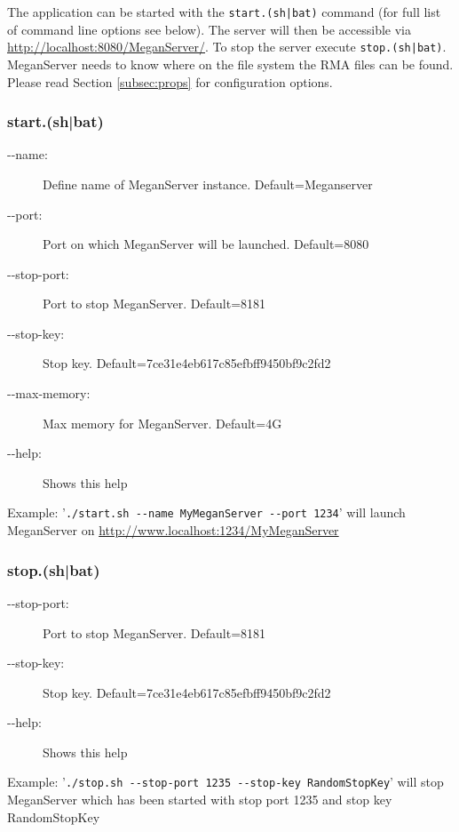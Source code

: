 \documentclass[11pt]{article}
\begin{document}
The application can be started with the \texttt{start.(sh|bat)} command (for full list of command line options see below). The server will then be accessible via \url{http://localhost:8080/MeganServer/}. To stop the server execute \texttt{stop.(sh|bat)}. MeganServer needs to know where on the file system the RMA files can be found. Please read Section \ref{subsec:props} for configuration options. 

\subsubsection{start.(sh|bat)}


\begin{description}
\item[-{}-name:] Define name of MeganServer instance. Default=Meganserver
\item[-{}-port:] Port on which MeganServer will be launched. Default=8080
\item[-{}-stop-port:] Port to stop MeganServer. Default=8181
\item[-{}-stop-key:] Stop key. Default=7ce31e4eb617c85efbff9450bf9c2fd2
\item[-{}-max-memory:] Max memory for MeganServer. Default=4G
\item[-{}-help:] Shows this help
\end{description}

Example:
'\texttt{./start.sh -{}-name MyMeganServer -{}-port 1234}' will launch MeganServer on \url{http://www.localhost:1234/MyMeganServer}

\subsubsection{stop.(sh|bat)}


\begin{description}
\item[-{}-stop-port:] Port to stop MeganServer. Default=8181
\item[-{}-stop-key:] Stop key. Default=7ce31e4eb617c85efbff9450bf9c2fd2
\item[-{}-help:] Shows this help
\end{description}
Example:
'\texttt{./stop.sh -{}-stop-port 1235 -{}-stop-key RandomStopKey}' will stop MeganServer which has been started with stop port 1235 and stop key RandomStopKey

\end{document}
